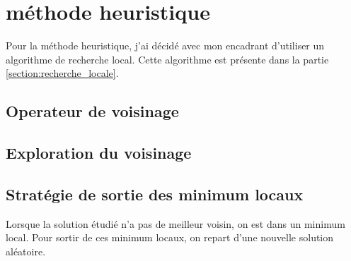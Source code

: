 \section{méthode heuristique}

Pour la méthode heuristique, j'ai décidé avec mon encadrant d'utiliser un algorithme de recherche local.
Cette algorithme est présente dans la partie \autoref{section:recherche_locale}.
	

\subsection{Operateur de voisinage}



\subsection{Exploration du voisinage}
\subsection{Stratégie de sortie des minimum locaux}
Lorsque la solution étudié n'a pas de meilleur voisin, on est dans un minimum local.
Pour sortir de ces minimum locaux, on repart d'une nouvelle solution aléatoire.
